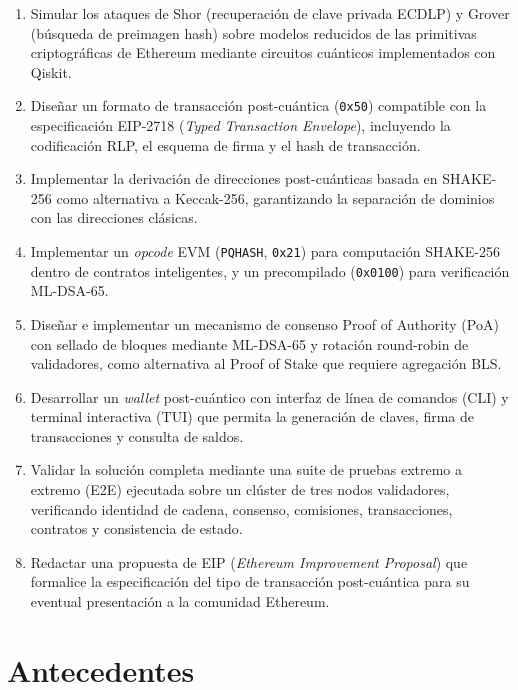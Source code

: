 \begin{enumerate}[label=\textbf{OE\arabic*.}]
  \item Simular los ataques de Shor (recuperación de clave privada ECDLP) y Grover (búsqueda de preimagen hash) sobre modelos reducidos de las primitivas criptográficas de Ethereum mediante circuitos cuánticos implementados con Qiskit.
  
  \item Diseñar un formato de transacción post-cuántica (\texttt{0x50}) compatible con la especificación EIP-2718 (\emph{Typed Transaction Envelope}), incluyendo la codificación RLP, el esquema de firma y el hash de transacción.
  
  \item Implementar la derivación de direcciones post-cuánticas basada en SHAKE-256 como alternativa a Keccak-256, garantizando la separación de dominios con las direcciones clásicas.
  
  \item Implementar un \emph{opcode} EVM (\texttt{PQHASH}, \texttt{0x21}) para computación SHAKE-256 dentro de contratos inteligentes, y un precompilado (\texttt{0x0100}) para verificación ML-DSA-65.
  
  \item Diseñar e implementar un mecanismo de consenso Proof of Authority (PoA) con sellado de bloques mediante ML-DSA-65 y rotación round-robin de validadores, como alternativa al Proof of Stake que requiere agregación BLS.
  
  \item Desarrollar un \emph{wallet} post-cuántico con interfaz de línea de comandos (CLI) y terminal interactiva (TUI) que permita la generación de claves, firma de transacciones y consulta de saldos.
  
  \item Validar la solución completa mediante una suite de pruebas extremo a extremo (E2E) ejecutada sobre un clúster de tres nodos validadores, verificando identidad de cadena, consenso, comisiones, transacciones, contratos y consistencia de estado.
  
  \item Redactar una propuesta de EIP (\emph{Ethereum Improvement Proposal}) que formalice la especificación del tipo de transacción post-cuántica para su eventual presentación a la comunidad Ethereum.
\end{enumerate}


\section{Antecedentes}

